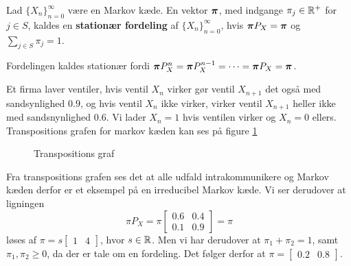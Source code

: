 \begin{defn}
Lad $\{X_n\}_{n = 0}^\infty$ være en Markov kæde. En vektor $\boldsymbol{\pi}$, med indgange $\pi_j \in \mathbb{R}^+$ for $j \in S$, kaldes en \textbf{stationær fordeling} af $\{X_n\}_{n = 0}^\infty$, hvis $\boldsymbol{\pi}P_X = \boldsymbol{\pi}$ og $\displaystyle \sum_{j \in S} \pi_j = 1$.
\end{defn}
Fordelingen kaldes stationær fordi $\boldsymbol{\pi} P_X^n = \boldsymbol{\pi} P_X^{n - 1} = \cdots = \boldsymbol{\pi} P_X = \boldsymbol{\pi}$.
\begin{example}
  Et firma laver ventiler, hvis ventil $X_{n}$ virker gør ventil $X_{n + 1}$ det også med sandsynlighed $0.9$, og hvis ventil $X_{n}$ ikke virker, virker ventil $X_{n + 1}$ heller ikke med sandsnynlighed $0.6$. Vi lader $X_{n} = 1$ hvis ventilen virker og $X_{n} = 0$ ellers. Transpositions grafen for markov kæden kan ses på figure \ref{fig:eksempel_stationary}
  \begin{figure}[H]
    \centering
    \caption{Transpositions graf}
    \label{fig:eksempel_stationary}
  \end{figure}\noindent
  Fra transpositions grafen ses det at alle udfald intrakommunikere og Markov kæden derfor er et eksempel på en irreducibel Markov kæde. Vi ser derudover at ligningen
  \begin{equation*}
    \pi P_{X} = \pi \begin{bmatrix}
                      0.6 & 0.4 \\ 0.1 & 0.9
                    \end{bmatrix} = \pi
  \end{equation*}
  løses af $\pi = s \begin{bmatrix} 1 & 4 \end{bmatrix}$, hvor $s \in \mathbb{R}$.
  Men vi har derudover at $\pi_{1} + \pi_{2} = 1$, samt $\pi_{1}, \pi_{2} \geq 0$, da der er tale om en fordeling.
  Det følger derfor at $\pi = \begin{bmatrix} 0.2 & 0.8 \end{bmatrix}$.
\end{example}
